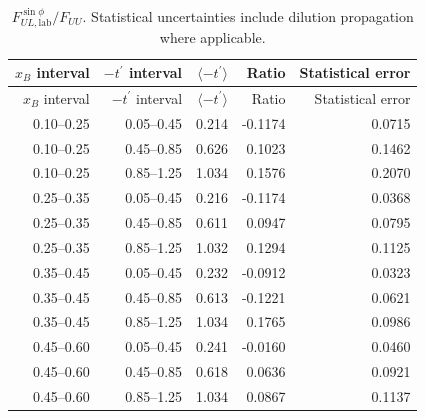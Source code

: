 \begin{longtable}{rrrrr}
\caption{$F_{UL,\mathrm{lab}}^{\sin\phi}/F_{UU}$. Statistical uncertainties include dilution propagation where applicable.}\label{tab:release_ul1}\\
\toprule
$x_B$ interval & $-t^\prime$ interval & $\langle-t^\prime\rangle$ & Ratio & Statistical error\\
\midrule\endfirsthead
\toprule $x_B$ interval & $-t^\prime$ interval & $\langle-t^\prime\rangle$ & Ratio & Statistical error\\\midrule\endhead
0.10--0.25 & 0.05--0.45 & 0.214 & -0.1174 & 0.0715\\
0.10--0.25 & 0.45--0.85 & 0.626 & 0.1023 & 0.1462\\
0.10--0.25 & 0.85--1.25 & 1.034 & 0.1576 & 0.2070\\
0.25--0.35 & 0.05--0.45 & 0.216 & -0.1174 & 0.0368\\
0.25--0.35 & 0.45--0.85 & 0.611 & 0.0947 & 0.0795\\
0.25--0.35 & 0.85--1.25 & 1.032 & 0.1294 & 0.1125\\
0.35--0.45 & 0.05--0.45 & 0.232 & -0.0912 & 0.0323\\
0.35--0.45 & 0.45--0.85 & 0.613 & -0.1221 & 0.0621\\
0.35--0.45 & 0.85--1.25 & 1.034 & 0.1765 & 0.0986\\
0.45--0.60 & 0.05--0.45 & 0.241 & -0.0160 & 0.0460\\
0.45--0.60 & 0.45--0.85 & 0.618 & 0.0636 & 0.0921\\
0.45--0.60 & 0.85--1.25 & 1.034 & 0.0867 & 0.1137\\
\bottomrule
\end{longtable}
